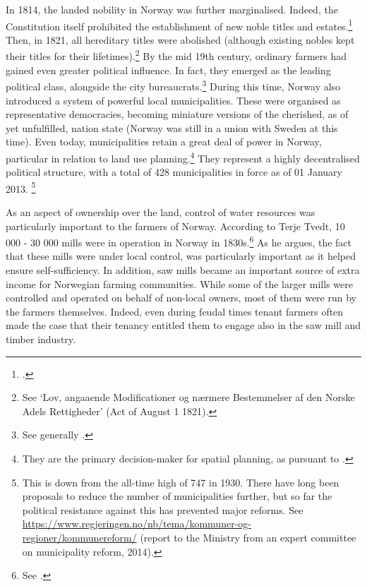 In 1814, the landed nobility in Norway was further marginalised. Indeed, the Constitution itself prohibited the establishment of new noble titles and estates.\footcite[23|118]{c14} Then, in 1821, all hereditary titles were abolished (although existing nobles kept their titles for their lifetimes).\footnote{See `Lov, angaaende Modificationer og nærmere Bestemmelser af den Norske Adels Rettigheder' (Act of August 1 1821).} By the mid 19th century, ordinary farmers had gained even greater political influence. In fact, they emerged as the leading political class, alongside the city bureaucrats.\footnote{See generally \cite{hommerstad14}.} During this time, Norway also introduced a system of powerful local municipalities. These were organised as representative democracies, becoming miniature versions of the cherished, as of yet unfulfilled, nation state (Norway was still in a union with Sweden at this time). Even today, municipalities retain a great deal of power in Norway, particular in relation to land use planning.\footnote{They are the primary decision-maker for spatial planning, as pursuant to \cite{pb08}.} They represent a highly decentralised political structure, with a total of 428 municipalities in force as of 01 January 2013. \footnote{This is down from the all-time high of 747 in 1930. There have long been proposals to reduce the number of municipalities further, but so far the political resistance against this has prevented major reforms. See \url{https://www.regjeringen.no/nb/tema/kommuner-og-regioner/kommunereform/} (report to the Ministry from an expert committee on municipality reform, 2014).}

As an aspect of ownership over the land, control of water resources was particularly important to the farmers of Norway. According to Terje Tvedt, 10 000 - 30 000 mills were in operation in Norway in 1830s.\footnote{See \cite[121]{tvedt13}.} As he argues, the fact that these mills were under local control, was particularly important as it helped ensure self-sufficiency. In addition, saw mills became an important source of extra income for Norwegian farming communities. While some of the larger mills were controlled and operated on behalf of non-local owners, most of them were run by the farmers themselves. Indeed, even during feudal times tenant farmers often made the case that their tenancy entitled them to engage also in the saw mill and timber industry.

